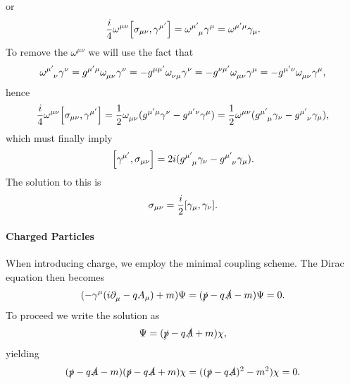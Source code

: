 or
\begin{align*}
	\frac{i}{4}\omega^{\mu\nu}\comm{\sigma_{\mu\nu}}{\gamma^{\mu\p}} = \tensor{\omega}{^{\mu\p}_{\mu}}\gamma^{\mu} = \tensor{\omega}{^{\mu\p\mu}}\gamma_{\mu}.
\end{align*}
To remove the $\omega^{\mu\nu}$ we will use the fact that
\begin{align*}
	\tensor{\omega}{^{\mu\p}_{\nu}}\gamma^{\nu} = g^{\mu\p\mu}\tensor{\omega}{_{\mu\nu}}\gamma^{\nu} = -g^{\mu\mu\p}\tensor{\omega}{_{\nu\mu}}\gamma^{\nu} = -g^{\nu\mu\p}\tensor{\omega}{_{\mu\nu}}\gamma^{\mu} = -g^{\mu\p\nu}\tensor{\omega}{_{\mu\nu}}\gamma^{\mu},
\end{align*}
hence
\begin{align*}
	\frac{i}{4}\omega^{\mu\nu}\comm{\sigma_{\mu\nu}}{\gamma^{\mu\p}} = \frac{1}{2}\tensor{\omega}{_{\mu\nu}}(g^{\mu\p\mu}\gamma^{\nu} - g^{\mu\p\nu}\gamma^{\mu}) = \frac{1}{2}\tensor{\omega}{^{\mu\nu}}(\tensor{g}{^{\mu\p}_{\mu}}\gamma_{\nu} - \tensor{g}{^{\mu\p}_{\nu}}\gamma_{\mu}),
\end{align*}
which must finally imply
\begin{align*}
	\comm{\gamma^{\mu\p}}{\sigma_{\mu\nu}} = 2i(\tensor{g}{^{\mu\p}_{\mu}}\gamma_{\nu} - \tensor{g}{^{\mu\p}_{\nu}}\gamma_{\mu}).
\end{align*}
The solution to this is
\begin{align*}
	\sigma_{\mu\nu} = \frac{i}{2}\comm{\gamma_{\mu}}{\gamma_{\nu}}.
\end{align*}

\paragraph{Charged Particles}
When introducing charge, we employ the minimal coupling scheme. The Dirac equation then becomes
\begin{align*}
	(-\gamma^{\mu}(i\partial^{}_{\mu}{} - qA_{\mu}) + m)\Psi = (\slashed{p} - q\slashed{A} - m)\Psi = 0.
\end{align*}
To proceed we write the solution as
\begin{align*}
	\Psi = (\slashed{p} - q\slashed{A} + m)\chi,
\end{align*}
yielding
\begin{align*}
	(\slashed{p} - q\slashed{A} - m)(\slashed{p} - q\slashed{A} + m)\chi = ((\slashed{p} - q\slashed{A})^{2} - m^{2})\chi = 0.
\end{align*}

